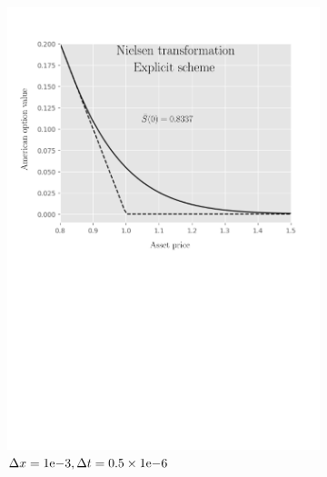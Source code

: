 \begin{figure}[H]
\begin{subfigure}{0.4\textwidth}
    \includegraphics[width=\textwidth]{chapters/chapter3/TestCase4ExplicitNielsen.pdf}
    \caption{$\Delta{x}={1}\mathrm{e}{-3}, \Delta{t}=0.5\times{1}\mathrm{e}{-6}$}
    \label{fig:finitedifferencesschemes:numericaresults:test_case_4_explicit_nielsen}
  \end{subfigure}
  \hspace{0.5cm}
  \begin{subfigure}{0.4\textwidth}
    \label{fig:finitedifferencesschemes:numericaresults:test_case_4_implicit_nielsen}
    \centering

\end{subfigure}
\end{figure}
